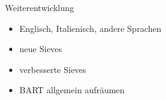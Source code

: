 \documentclass[11pt,a4paper]{beamer}
\begin{document}
\begin{frame}{Weiterentwicklung}
\begin{itemize}
\item Englisch, Italienisch, andere Sprachen
\item neue Sieves 
\item verbesserte Sieves
\item BART allgemein aufräumen
\end{itemize}
\end{frame}


%
%
\end{document}
